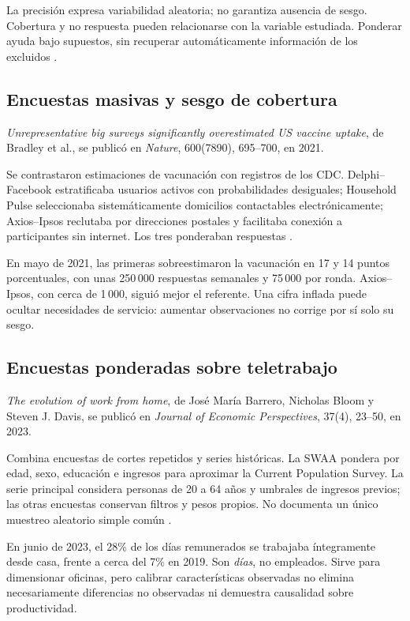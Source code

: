 {La precisión expresa variabilidad aleatoria; no garantiza ausencia de sesgo. Cobertura y no respuesta pueden relacionarse con la variable estudiada. Ponderar ayuda bajo supuestos, sin recuperar automáticamente información de los excluidos \citep{holmesBusiness2023,bradley2021}.

\subsection{Encuestas masivas y sesgo de cobertura}
\textit{Unrepresentative big surveys significantly overestimated US vaccine uptake}, de Bradley et al., se publicó en \textit{Nature}, 600(7890), 695--700, en 2021.

Se contrastaron estimaciones de vacunación con registros de los CDC. Delphi--Facebook estratificaba usuarios activos con probabilidades desiguales; Household Pulse seleccionaba sistemáticamente domicilios contactables electrónicamente; Axios--Ipsos reclutaba por direcciones postales y facilitaba conexión a participantes sin internet. Los tres ponderaban respuestas \citep{bradley2021}.

En mayo de 2021, las primeras sobreestimaron la vacunación en 17 y 14 puntos porcentuales, con unas 250\,000 respuestas semanales y 75\,000 por ronda. Axios--Ipsos, con cerca de 1\,000, siguió mejor el referente. Una cifra inflada puede ocultar necesidades de servicio: aumentar observaciones no corrige por sí solo su sesgo.

\clearpage
\subsection{Encuestas ponderadas sobre teletrabajo}
\textit{The evolution of work from home}, de José María Barrero, Nicholas Bloom y Steven J. Davis, se publicó en \textit{Journal of Economic Perspectives}, 37(4), 23--50, en 2023.

Combina encuestas de cortes repetidos y series históricas. La SWAA pondera por edad, sexo, educación e ingresos para aproximar la Current Population Survey. La serie principal considera personas de 20 a 64 años y umbrales de ingresos previos; las otras encuestas conservan filtros y pesos propios. No documenta un único muestreo aleatorio simple común \citep{barrero2023}.

En junio de 2023, el 28\% de los días remunerados se trabajaba íntegramente desde casa, frente a cerca del 7\% en 2019. Son \textit{días}, no empleados. Sirve para dimensionar oficinas, pero calibrar características observadas no elimina necesariamente diferencias no observadas ni demuestra causalidad sobre productividad.

}
